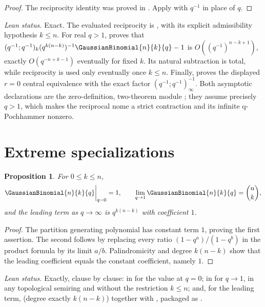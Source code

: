\documentclass[11pt,a4paper,oneside,openany]{book}
\newtheorem{proposition}[proposition]{Proposition}
\theoremstyle{definition}
\theoremstyle{remark}
\begin{document}
\begin{proof}
The reciprocity identity was proved in .  Apply  with $q^{-1}$ in place of $q$.
\end{proof}
\emph{Lean status.}  Exact.  The evaluated reciprocity is
, with its explicit admissibility hypothesis
\(k\le n\).  For real \(q>1\),
proves that
\((q^{-1};q^{-1})_k(q^{k(n-k)})^{-1}\GaussianBinomial{n}{k}{q}-1\)
is \(O((q^{-1})^{n-k+1})\), exactly
\(O(q^{-n+k-1})\) eventually for fixed \(k\).  Its natural subtraction is
total, while reciprocity is used only eventually once \(k\le n\).
Finally,
 proves the
displayed \(r=0\) central equivalence with the exact factor
\((q^{-1};q^{-1})_\infty^{-1}\).  Both asymptotic declarations are the
zero-definition, two-theorem module
; they assume precisely
\(q>1\), which makes the reciprocal nome a strict contraction and its
infinite q-Pochhammer nonzero.

\section{Extreme specializations}

\begin{proposition}\label{prop:extreme-specializations}
For $0\le k\le n$,
\[
 \GaussianBinomial{n}{k}{q}\bigg|_{q=0}=1,
 \qquad
 \lim_{q\to1}\GaussianBinomial{n}{k}{q}=\binom nk,
\]
and the leading term as $q\to\infty$ is $q^{k(n-k)}$ with coefficient $1$.
\end{proposition}

\begin{proof}
The partition generating polynomial has constant term $1$, proving the first assertion.  The second follows by replacing every ratio $(1-q^a)/(1-q^b)$ in the product formula by its limit $a/b$.  Palindromicity and degree $k(n-k)$ show that the leading coefficient equals the constant coefficient, namely $1$.
\end{proof}
\emph{Lean status.}  Exactly, clause by clause:  in
 for the value at \(q=0\);
 in  for
\(q\to1\), in any topological semiring and without the restriction \(k\le n\); and, for the
leading term,  (degree exactly \(k(n-k)\)) together with
, packaged as .
\end{document}

